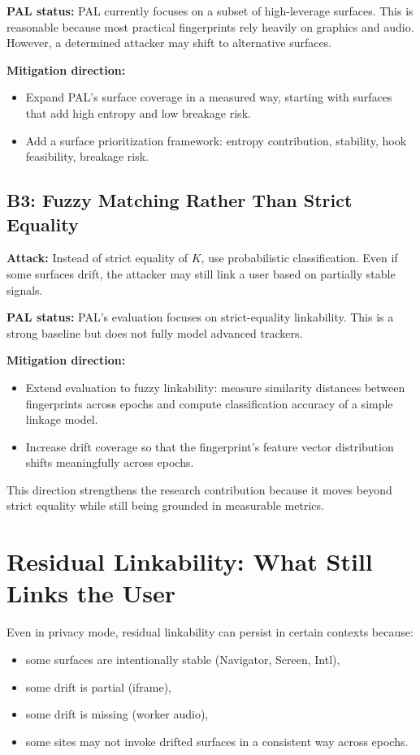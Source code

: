 \documentclass[11pt]{report}
\begin{document}
\textbf{PAL status:} PAL currently focuses on a subset of high-leverage surfaces. This is reasonable because most practical fingerprints rely heavily on graphics and audio. However, a determined attacker may shift to alternative surfaces.

\textbf{Mitigation direction:}
\begin{itemize}
    \item Expand PAL’s surface coverage in a measured way, starting with surfaces that add high entropy and low breakage risk.
    \item Add a surface prioritization framework: entropy contribution, stability, hook feasibility, breakage risk.
\end{itemize}

\subsection{B3: Fuzzy Matching Rather Than Strict Equality}

\textbf{Attack:} Instead of strict equality of $K$, use probabilistic classification. Even if some surfaces drift, the attacker may still link a user based on partially stable signals.

\textbf{PAL status:} PAL’s evaluation focuses on strict-equality linkability. This is a strong baseline but does not fully model advanced trackers.

\textbf{Mitigation direction:}
\begin{itemize}
    \item Extend evaluation to fuzzy linkability: measure similarity distances between fingerprints across epochs and compute classification accuracy of a simple linkage model.
    \item Increase drift coverage so that the fingerprint’s feature vector distribution shifts meaningfully across epochs.
\end{itemize}

This direction strengthens the research contribution because it moves beyond strict equality while still being grounded in measurable metrics.

\section{Residual Linkability: What Still Links the User}

Even in privacy mode, residual linkability can persist in certain contexts because:

\begin{itemize}
    \item some surfaces are intentionally stable (Navigator, Screen, Intl),
    \item some drift is partial (iframe),
    \item some drift is missing (worker audio),
    \item some sites may not invoke drifted surfaces in a consistent way across epochs.
\end{itemize}
\end{document}
